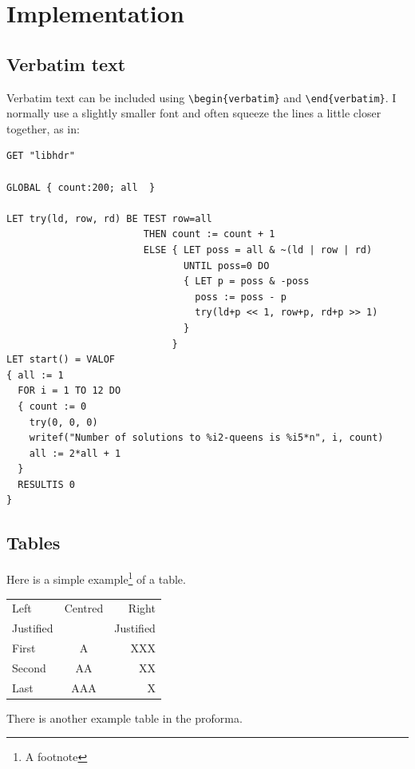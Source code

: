 \documentclass[12pt,a4paper,twoside,openright]{report}
\renewcommand{\baselinestretch}{1.1}    %
\begin{document}
\chapter{Implementation}



\section{Verbatim text}

Verbatim text can be included using \verb|\begin{verbatim}| and
\verb|\end{verbatim}|. I normally use a slightly smaller font and
often squeeze the lines a little closer together, as in:

{\renewcommand{\baselinestretch}{0.8}\small
\begin{verbatim}
GET "libhdr"
 
GLOBAL { count:200; all  }
 
LET try(ld, row, rd) BE TEST row=all
                        THEN count := count + 1
                        ELSE { LET poss = all & ~(ld | row | rd)
                               UNTIL poss=0 DO
                               { LET p = poss & -poss
                                 poss := poss - p
                                 try(ld+p << 1, row+p, rd+p >> 1)
                               }
                             }
LET start() = VALOF
{ all := 1
  FOR i = 1 TO 12 DO
  { count := 0
    try(0, 0, 0)
    writef("Number of solutions to %i2-queens is %i5*n", i, count)
    all := 2*all + 1
  }
  RESULTIS 0
}
\end{verbatim}
}

\section{Tables}

\begin{samepage}
Here is a simple example\footnote{A footnote} of a table.

\begin{center}
\begin{tabular}{l|c|r}
Left      & Centred & Right \\
Justified &         & Justified \\[3mm]
First     & A       & XXX \\
Second    & AA      & XX  \\
Last      & AAA     & X   \\
\end{tabular}
\end{center}

\noindent
There is another example table in the proforma.
\end{samepage}
\end{document}
